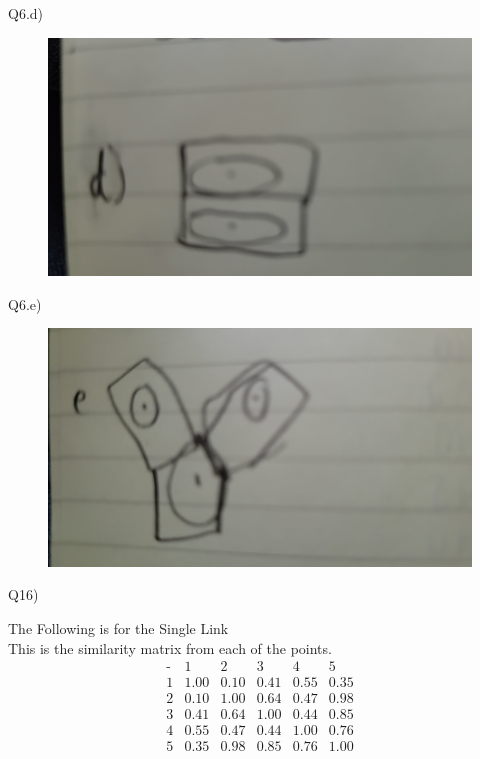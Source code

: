 \documentclass[12pt,english]{article}
\begin{document}
Q6.d)\\
\begin{figure}[H]
  \includegraphics[width=\linewidth]{d.jpg}
\end{figure}
Q6.e)\\
\begin{figure}[H]
  \includegraphics[width=\linewidth]{e.jpg}
\end{figure}
Q16)\par
The Following is for the Single Link\\
This is the similarity matrix from each of the points.
\begin{equation*}
\begin{array}{c|ccccc}
\mbox{-}& 1 & 2 & 3 & 4 & 5\\
\hline
1 & 1.00 & 0.10 & 0.41 & 0.55 & 0.35 \\
2 & 0.10 & 1.00 & 0.64 & 0.47 & 0.98 \\
3 & 0.41 & 0.64 & 1.00 & 0.44 & 0.85 \\
4 & 0.55 & 0.47 & 0.44 & 1.00 & 0.76 \\
5 & 0.35 & 0.98 & 0.85 & 0.76 & 1.00 
\end{array}
\end{equation*}\\
\end{document}
